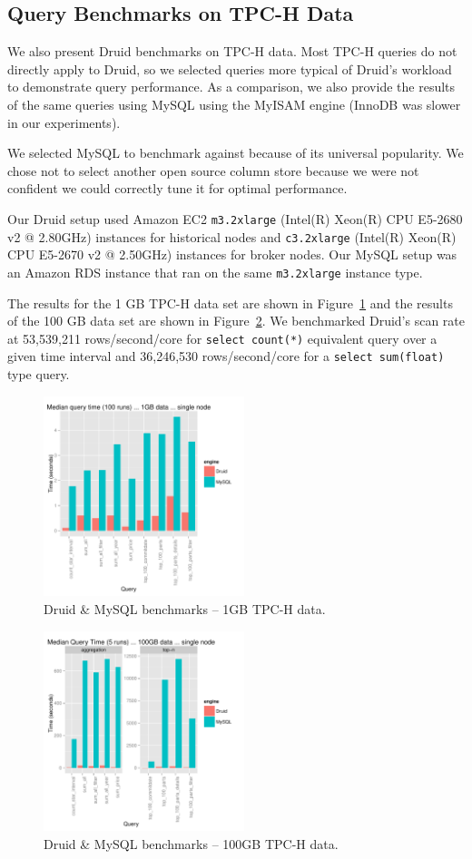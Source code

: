 \documentclass{sig-alternate-2013}
\begin{document}
\subsection{Query Benchmarks on TPC-H Data}
We also present Druid benchmarks on TPC-H data. 
Most TPC-H queries do not directly apply to Druid, so we
selected queries more typical of Druid's workload to demonstrate query performance. As a
comparison, we also provide the results of the same queries using MySQL using the
MyISAM engine (InnoDB was slower in our experiments).

We selected MySQL to benchmark
against because of its universal popularity. We chose not to select another
open source column store because we were not confident we could correctly tune
it for optimal performance.

Our Druid setup used Amazon EC2
\texttt{m3.2xlarge} (Intel(R) Xeon(R) CPU E5-2680 v2 @ 2.80GHz) instances for
historical nodes and \texttt{c3.2xlarge} (Intel(R) Xeon(R) CPU E5-2670 v2 @ 2.50GHz) instances for broker
nodes. Our MySQL setup was an Amazon RDS instance that ran on the same \texttt{m3.2xlarge} instance type.

The results for the 1 GB TPC-H data set are shown
in Figure~\ref{fig:tpch_1gb} and the results of the 100 GB data set are shown
in Figure~\ref{fig:tpch_100gb}. We benchmarked Druid's scan rate at
53,539,211 rows/second/core for \texttt{select count(*)} equivalent query over a given time interval
and 36,246,530 rows/second/core for a \texttt{select sum(float)} type query.

\begin{figure}
\centering
\includegraphics[width = 2.3in]{tpch_1gb}
\caption{Druid \& MySQL benchmarks -- 1GB TPC-H data.}
\label{fig:tpch_1gb}
\end{figure}

\begin{figure}
\centering
\includegraphics[width = 2.3in]{tpch_100gb}
\caption{Druid \& MySQL benchmarks -- 100GB TPC-H data.}
\label{fig:tpch_100gb}
\end{figure}
\end{document}

